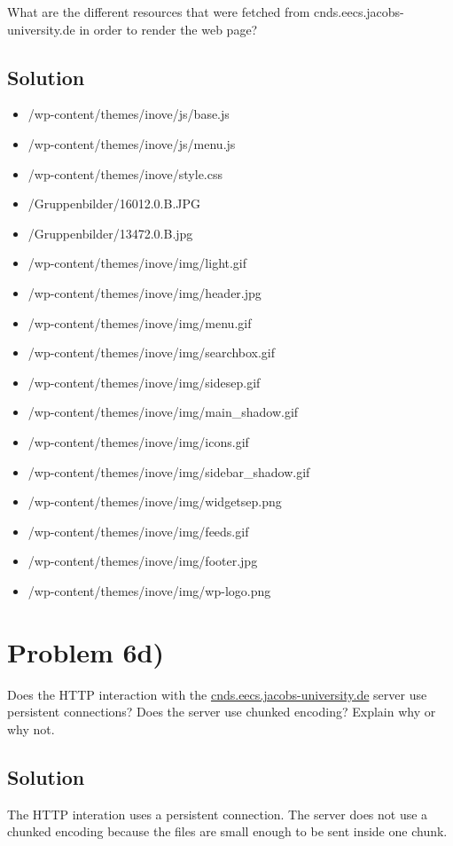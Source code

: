 \documentclass[a4paper,10pt]{article}
\begin{document}
What are the different resources that were fetched from cnds.eecs.jacobs-university.de in
order to render the web page?

\subsection{Solution}

\begin{itemize}
  \item /wp-content/themes/inove/js/base.js
  \item /wp-content/themes/inove/js/menu.js
  \item /wp-content/themes/inove/style.css
  \item /Gruppenbilder/16012.0.B.JPG
  \item /Gruppenbilder/13472.0.B.jpg
  \item /wp-content/themes/inove/img/light.gif
  \item /wp-content/themes/inove/img/header.jpg
  \item /wp-content/themes/inove/img/menu.gif
  \item /wp-content/themes/inove/img/searchbox.gif
  \item /wp-content/themes/inove/img/sidesep.gif
  \item /wp-content/themes/inove/img/main\_shadow.gif
  \item /wp-content/themes/inove/img/icons.gif
  \item /wp-content/themes/inove/img/sidebar\_shadow.gif
  \item /wp-content/themes/inove/img/widgetsep.png
  \item /wp-content/themes/inove/img/feeds.gif
  \item /wp-content/themes/inove/img/footer.jpg
  \item /wp-content/themes/inove/img/wp-logo.png
\end{itemize}

\section{Problem 6d)}
Does the HTTP interaction with the \url{cnds.eecs.jacobs-university.de} server use persistent
connections? Does the server use chunked encoding? Explain why or why not.

\subsection{Solution}
The HTTP interation uses a persistent connection. The server does not use a chunked encoding because the files are small enough to be sent inside one chunk.
\end{document}
